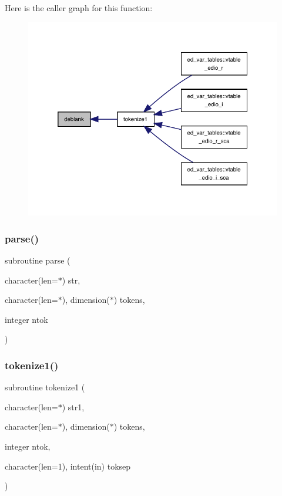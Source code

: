 Here is the caller graph for this function\+:
\nopagebreak
\begin{figure}[H]
\begin{center}
\leavevmode
\includegraphics[width=332pt]{charutils_8f90_ae6acc7e2374eb737e74a4edf85c3f1c2_icgraph}
\end{center}
\end{figure}
\mbox{\label{charutils_8f90_a386868af54eb7d95d214363b9132230f}} 
\subsubsection{\texorpdfstring{parse()}{parse()}}
{\footnotesize\ttfamily subroutine parse (\begin{DoxyParamCaption}\item[{character(len=$\ast$)}]{str,  }\item[{character(len=$\ast$), dimension($\ast$)}]{tokens,  }\item[{integer}]{ntok }\end{DoxyParamCaption})}

\mbox{\label{charutils_8f90_a4e0b5a3a2a3a429434a954e8af39d758}} 
\subsubsection{\texorpdfstring{tokenize1()}{tokenize1()}}
{\footnotesize\ttfamily subroutine tokenize1 (\begin{DoxyParamCaption}\item[{character(len=$\ast$)}]{str1,  }\item[{character(len=$\ast$), dimension($\ast$)}]{tokens,  }\item[{integer}]{ntok,  }\item[{character(len=1), intent(in)}]{toksep }\end{DoxyParamCaption})}

